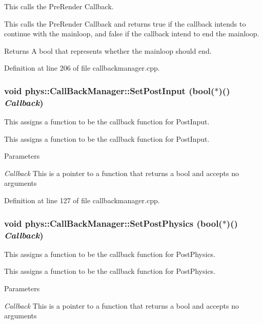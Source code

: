 This calls the PreRender Callback. 

This calls the PreRender Callback and returns true if the callback intends to continue with the mainloop, and false if the callback intend to end the mainloop. \begin{DoxyReturn}{Returns}
A bool that represents whether the mainloop should end. 
\end{DoxyReturn}


Definition at line 206 of file callbackmanager.cpp.

\hypertarget{classphys_1_1CallBackManager_abbf73a7199a64d6a2a39c7de44c5acd6}{
\subsubsection[{SetPostInput}]{\setlength{\rightskip}{0pt plus 5cm}void phys::CallBackManager::SetPostInput (bool($\ast$)() {\em Callback})}}
\label{d1/d47/classphys_1_1CallBackManager_abbf73a7199a64d6a2a39c7de44c5acd6}


This assigns a function to be the callback function for PostInput. 

This assigns a function to be the callback function for PostInput. 
\begin{DoxyParams}{Parameters}
\item[{\em Callback}]This is a pointer to a function that returns a bool and accepts no arguments \end{DoxyParams}


Definition at line 127 of file callbackmanager.cpp.

\hypertarget{classphys_1_1CallBackManager_a17687cd04807dfc80a25847be830c2f2}{
\subsubsection[{SetPostPhysics}]{\setlength{\rightskip}{0pt plus 5cm}void phys::CallBackManager::SetPostPhysics (bool($\ast$)() {\em Callback})}}
\label{d1/d47/classphys_1_1CallBackManager_a17687cd04807dfc80a25847be830c2f2}


This assigns a function to be the callback function for PostPhysics. 

This assigns a function to be the callback function for PostPhysics. 
\begin{DoxyParams}{Parameters}
\item[{\em Callback}]This is a pointer to a function that returns a bool and accepts no arguments \end{DoxyParams}


